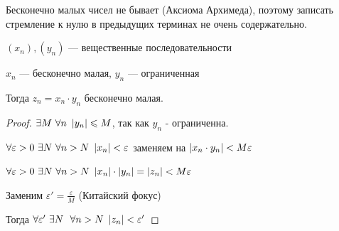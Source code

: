     \begin{remark}
        Бесконечно малых чисел не бывает (Аксиома Архимеда), поэтому записать стремление к нулю в предыдущих терминах не очень содержательно.
    \end{remark}
    \begin{theorem*}
    
    $(x_n), (y_n)$ {---} вещественные последовательности
    
    $x_n$ {---} бесконечно малая, $y_n$ {---} ограниченная
    
    Тогда $z_n = x_n \cdot y_n$ бесконечно малая.
    \end{theorem*}
    \begin{proof}
    $\exists M \  \forall n \ \abs{y_n} \leqslant M $, так как $y_n$ - ограниченна.
    
    $\forall \varepsilon > 0 \ \exists N  \ \forall n > N \ \abs{x_n} < \varepsilon$
    заменяем на
    $\left| x_n \cdot y_n \right| < M  \varepsilon$
      
    $\forall \varepsilon > 0 \ \exists N \ \forall n > N \ \abs{x_n}\cdot\abs{y_n} = \abs{z_n} < M\varepsilon $ 
    
    Заменим $\varepsilon' = \frac{\varepsilon}{M}$ (Китайский фокус)
    
    Тогда $\forall \varepsilon' \ \exists N \ \ \forall n > N \ \abs{z_n} < \varepsilon'$
    
    
    \end{proof}